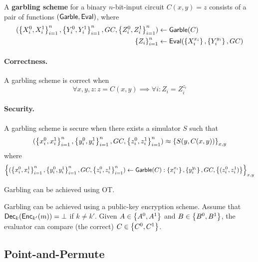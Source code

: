\begin{prcl}
A \textbf{garbling scheme} for a binary $n$-bit-input circuit $C(x,y) = z$ consists of a pair of functions $(\textsf{Garble}, \textsf{Eval})$, where
\begin{align*}
    (
        \left\{X_i^0, X_i^1\right\}^n_{i=1},
        \left\{Y_i^0, Y_i^1\right\}^n_{i=1},
        GC,
        \left\{Z_i^0, Z_i^1\right\}^n_{i=1}
    )
    &\gets
    \textsf{Garble}(C)
    \\
    \left\{Z_i\right\}^n_{i=1}
    &\gets 
    \textsf{Eval}(\left\{X_i^{x_i}\right\}, \left\{Y_i^{y_i}\right\}, GC)
\end{align*}

\paragraph{Correctness.}
A garbling scheme is correct when 
\[
    \forall x,y,z:
    z = C(x,y) \implies 
    \forall i: Z_i = Z_i^{z_i}
\]

\paragraph{Security.}
A garbling scheme is secure when there exists a simulator $S$ such that
\[
    (
        \left\{x_i^0, x_i^1\right\}^n_{i=1},
        \left\{y_i^0, y_i^1\right\}^n_{i=1},
        GC,
        \left\{z_i^0, z_i^1\right\}^n_{i=1}
    )
    \approx 
    \left\{S(y,C(x,y))\right\}_{x,y}
\]
where
\[
    \left\{
    (
        \left\{x_i^0, x_i^1\right\}^n_{i=1},
        \left\{y_i^0, y_i^1\right\}^n_{i=1},
        GC,
        \left\{z_i^0, z_i^1\right\}^n_{i=1}
    )
    \gets 
    \textsf{Garble}(C) : \left\{x_i^{x_i}\right\}, \left\{y_i^{y_i}\right\}, GC, \left\{(z_i^0, z_i^1)\right\}
    \right\}_{x,y}
\]
\end{prcl}


\begin{expl}
Garbling can be achieved using OT.
\end{expl}

\begin{expl}
Garbling can be achieved using a public-key encryption scheme.
Assume that $\mathsf{Dec}_k(\mathsf{Enc}_{k'}(m)) = \bot$ if $k \neq k'$.
Given $A \in \left\{A^0, A^1\right\}$ and $B \in \left\{B^0, B^1\right\}$, the evaluator can compare (the correct) $C \in \left\{C^0, C^1\right\}$.
\end{expl}

\subsection{Point-and-Permute}

